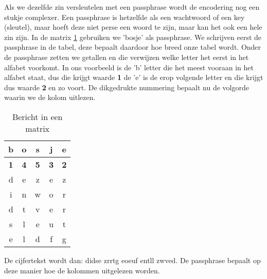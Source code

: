 Als we dezelfde zin versleutelen met een passphrase wordt de encodering nog een stukje complexer. Een passphrase is hetzelfde als een wachtwoord of een key (sleutel), maar hoeft deze niet perse een woord te zijn, maar kan het ook een hele zin zijn. In de matrix \ref{tab:matrix_passphrase} gebruiken we 'bosje' als passphrase. We schrijven eerst de passphrase in de tabel, deze bepaalt daardoor hoe breed onze tabel wordt. Onder de passphrase zetten we getallen en die verwijzen welke letter het eerst in het alfabet voorkomt. In ons voorbeeld is de 'b' letter die het meest vooraan in het alfabet staat, dus die krijgt waarde \textbf{1} de 'e' is de erop volgende letter en die krijgt dus waarde \textbf{2} en zo voort. De dikgedrukte nummering bepaalt nu de volgorde waarin we de kolom uitlezen.

\begin{table}[h]
\centering
\begin{tabular}{|c|c|c|c|c|}
\hline
	b &
	o &
	s &
	j &
	e \\
\hline
	\textbf{1} &
	\textbf{4} &
	\textbf{5} &
	\textbf{3} &
	\textbf{2} \\

\hline
\hline
	d &
	e &
	z &
	e &
	z \\
\hline
	i &
	n &
	w &
	o &
	r \\
\hline
	d &
	t &
	v &
	e &
	r \\
\hline
	s &
	l &
	e &
	u &
	t \\
\hline
	e &
	l &
	d &
	f &
	g \\
\hline
\end{tabular}
\caption{Bericht in een matrix}
\label{tab:matrix_passphrase}
\end{table}
De cijfertekst wordt dan: didse zrrtg eoeuf entll zwved. De passphrase bepaalt op deze manier hoe de kolommen uitgelezen worden.

